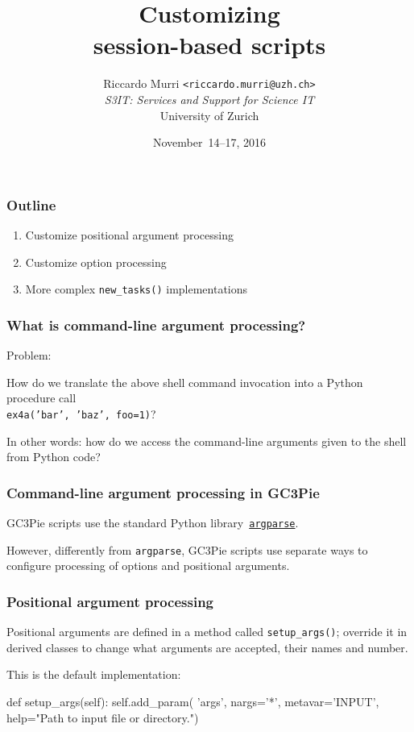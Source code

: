 \documentclass[english,serif,mathserif,xcolor=pdftex,dvipsnames,table]{beamer}
\title[Introduction]{%
  Customizing \\ session-based scripts
}
\author[R. Murri, S3IT UZH]{%
  Riccardo Murri \texttt{<riccardo.murri@uzh.ch>}
  \\[1ex]
  \emph{S3IT: Services and Support for Science IT}
  \\[1ex]
  University of Zurich
}
\date{November~14--17, 2016}
\begin{document}
\maketitle


\begin{frame}
  \frametitle{Outline}
  \begin{enumerate}
  \item Customize positional argument processing
  \item Customize option processing
  \item More complex \texttt{new\_tasks()} implementations
  \end{enumerate}
\end{frame}


\begin{frame}[fragile]
  \frametitle{What is command-line argument processing?}

  Problem:

  \+
  How do we translate the above shell command invocation into a
  Python procedure call \\ \texttt{ex4a('bar', 'baz', foo=1)}?

  \+
  In other words: how do we access the command-line arguments given
  to the shell from Python code?
\end{frame}


\begin{frame}
  \frametitle{Command-line argument processing in GC3Pie}

  GC3Pie scripts use the standard Python
  library~\href{https://docs.python.org/2/howto/argparse.html}{\texttt{argparse}}.

  \+
  However, differently from \texttt{argparse}, GC3Pie scripts use
  separate ways to configure processing of options and positional
  arguments.
\end{frame}

\begin{frame}[fragile]
  \frametitle{Positional argument processing}

  Positional arguments are defined in a method called
  \lstinline|setup_args()|; override it in derived classes to change
  what arguments are accepted, their names and number.

  \+
  This is the default implementation:
\begin{python}
  def setup_args(self):
    self.add_param(
      'args', nargs='*', metavar='INPUT',
      help="Path to input file or directory.")
\end{python}
\end{frame}
\end{document}
